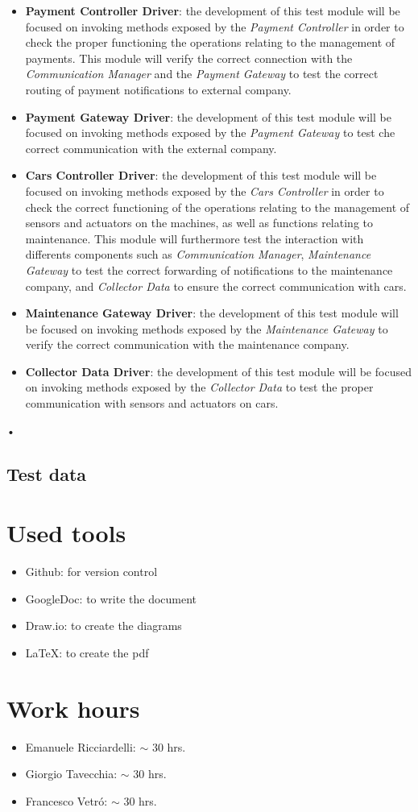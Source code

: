 \documentclass[10pt, a4paper,titlepage]{article}
\begin{document}
\begin{itemize}
\item \textbf{Payment Controller Driver}: the development of this test module will be focused on invoking methods exposed by the \emph{Payment Controller} in order to check the proper functioning the operations relating to the management of payments. This module will verify the correct connection with the \emph{Communication Manager} and the \emph{Payment Gateway} to test the correct routing of payment notifications to external company.
\item \textbf{Payment Gateway Driver}: the development of this test module will be focused on invoking methods exposed by the \emph{Payment Gateway} to test che correct communication with the external company.
\item \textbf{Cars Controller Driver}: the development of this test module will be focused on invoking methods exposed by the \emph{Cars Controller} in order to check the correct functioning of the operations relating to the management of sensors and actuators on the machines, as well as functions relating to maintenance. This module will furthermore test the interaction with differents components such as \emph{Communication Manager}, \emph{Maintenance Gateway} to test the correct forwarding of notifications to the maintenance company, and \emph{Collector Data} to ensure the correct communication with cars.
\item \textbf{Maintenance Gateway Driver}: the development of this test module will be focused on invoking methods exposed by the \emph{Maintenance Gateway} to verify the correct communication with the maintenance company.
\item \textbf{Collector Data Driver}: the development of this test module will be focused on invoking methods exposed by the \emph{Collector Data} to test the proper communication with sensors and actuators on cars.
\end{itemize}•
\subsection{Test data}
\section*{Used tools}
\begin{itemize}
\item Github: for version control
\item GoogleDoc: to write the document
\item Draw.io: to create the diagrams
\item \LaTeX: to create the pdf
\end{itemize}
\section*{Work hours} 
\begin{itemize}
\item Emanuele Ricciardelli: $\sim$ 30 hrs.
\item Giorgio Tavecchia: $\sim$ 30 hrs.
\item Francesco Vetr\'o: $\sim$ 30 hrs.
\end{itemize}
\end{document}
